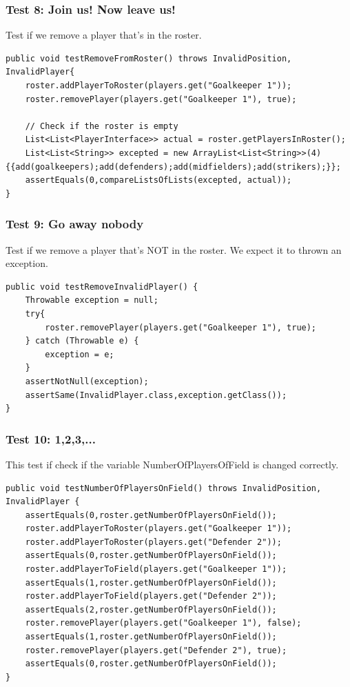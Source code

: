 \documentclass{article}
\begin{document}
\subsubsection{Test 8: Join us! Now leave us!}
Test if we remove a player that's in the roster.
\begin{lstlisting}
public void testRemoveFromRoster() throws InvalidPosition, InvalidPlayer{
	roster.addPlayerToRoster(players.get("Goalkeeper 1"));
	roster.removePlayer(players.get("Goalkeeper 1"), true);
	
	// Check if the roster is empty
	List<List<PlayerInterface>> actual = roster.getPlayersInRoster();
	List<List<String>> excepted = new ArrayList<List<String>>(4) {{add(goalkeepers);add(defenders);add(midfielders);add(strikers);}};
	assertEquals(0,compareListsOfLists(excepted, actual));
}
\end{lstlisting}

\subsubsection{Test 9: Go away nobody}
Test if we remove a player that's NOT in the roster. We expect it to thrown an exception.
\begin{lstlisting}
public void testRemoveInvalidPlayer() {
	Throwable exception = null;
	try{
		roster.removePlayer(players.get("Goalkeeper 1"), true);
	} catch (Throwable e) {
		exception = e;
	}
	assertNotNull(exception);
	assertSame(InvalidPlayer.class,exception.getClass());
}
\end{lstlisting}

\subsubsection{Test 10: 1,2,3,...}
This test if check if the variable NumberOfPlayersOfField is changed correctly.
\begin{lstlisting}
public void testNumberOfPlayersOnField() throws InvalidPosition, InvalidPlayer {
	assertEquals(0,roster.getNumberOfPlayersOnField());
	roster.addPlayerToRoster(players.get("Goalkeeper 1"));
	roster.addPlayerToRoster(players.get("Defender 2"));
	assertEquals(0,roster.getNumberOfPlayersOnField());
	roster.addPlayerToField(players.get("Goalkeeper 1"));
	assertEquals(1,roster.getNumberOfPlayersOnField());
	roster.addPlayerToField(players.get("Defender 2"));
	assertEquals(2,roster.getNumberOfPlayersOnField());
	roster.removePlayer(players.get("Goalkeeper 1"), false);
	assertEquals(1,roster.getNumberOfPlayersOnField());
	roster.removePlayer(players.get("Defender 2"), true);
	assertEquals(0,roster.getNumberOfPlayersOnField());
}
\end{lstlisting}
\end{document}
